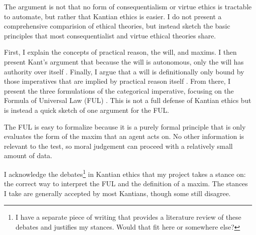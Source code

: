 \begin{isabellebody}
\begin{isamarkuptext}
The argument is not that no form of consequentialism or virtue ethics is tractable to automate, but 
rather that Kantian ethics is easier. I do not present a comprehensive comparision
of ethical theories, but instead sketch the basic principles that most consequentialist and virtue 
ethical theories share.%
\end{isamarkuptext}\isamarkuptrue%
%
\isadelimdocument
%
\endisadelimdocument
%
\isatagdocument
%
\isamarkuptrue%
%
\isamarkuptrue%
%
\endisatagdocument
{\isafolddocument}%
%
\isadelimdocument
%
\endisadelimdocument
%
\begin{isamarkuptext}%
First, I explain the concepts of 
practical reason, the will, and maxims. I then present Kant's argument that because the will is autonomous,
only the will has authority over itself \cite{sources}. Finally, I argue that a will is definitionally only 
bound by those imperatives that are implied by practical reason itself \cite{velleman}. From there, I present 
the three formulations of the categorical imperative, focusing on the Formula of Universal Law (FUL) \cite{groundwork}. 
This is not a full defense of Kantian ethics but is instead a quick sketch of one argument for the FUL.%
\end{isamarkuptext}\isamarkuptrue%
%
\isadelimdocument
%
\endisadelimdocument
%
\isatagdocument
%
\isamarkuptrue%
%
\endisatagdocument
{\isafolddocument}%
%
\isadelimdocument
%
\endisadelimdocument
%
\begin{isamarkuptext}%
The FUL is easy to formalize
because it is a purely formal principle that is only evaluates the form of the maxim that an agent 
acts on. No other information is relevant to the test, so moral judgement can proceed with a relatively small
amount of data.%
\end{isamarkuptext}\isamarkuptrue%
%
\isadelimdocument
%
\endisadelimdocument
%
\isatagdocument
%
\isamarkuptrue%
%
\endisatagdocument
{\isafolddocument}%
%
\isadelimdocument
%
\endisadelimdocument
%
\begin{isamarkuptext}%
I acknowledge the debates\footnote{I have a separate piece of writing that provides a literature 
review of these debates and justifies my stances. Would that fit here or somewhere else?} in Kantian 
ethics that my project takes a stance on: the correct way to interpret the FUL and the definition of a 
maxim. The stances I take are generally accepted by most Kantians, though some still disagree.%

\end{isamarkuptext}
\end{isabellebody}
